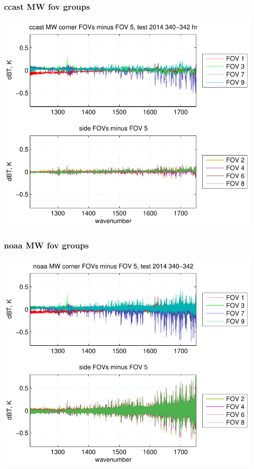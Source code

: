 \documentclass[11pt]{beamer}
\begin{document}
\begin{frame}
\frametitle{ccast MW fov groups}

\begin{center}
  \includegraphics[scale=0.7]{figures/ccast_MW_dif_2014_340-342_hr.pdf}
\end{center}

\end{frame}
\begin{frame}
\frametitle{noaa MW fov groups}

\begin{center}
  \includegraphics[scale=0.7]{figures/noaa_MW_dif_2014_340-342.pdf}
\end{center}

\end{frame}
\end{document}
